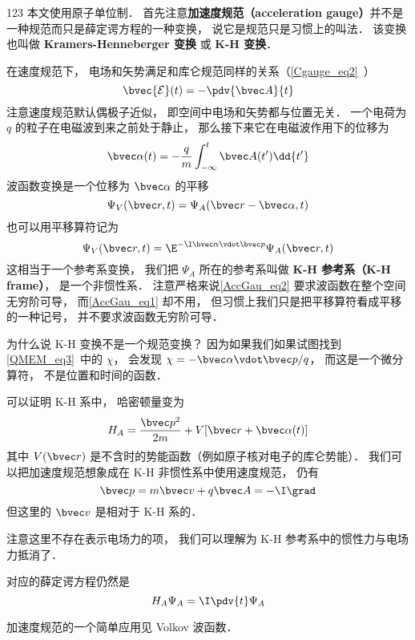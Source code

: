 

123 本文使用原子单位制． 首先注意\textbf{加速度规范（acceleration gauge）}并不是一种规范而只是薛定谔方程的一种变换， 说它是规范只是习惯上的叫法． 该变换也叫做 \textbf{Kramers-Henneberger 变换} 或 \textbf{K-H 变换}．

在速度规范下， 电场和矢势满足和库仑规范同样的关系（\autoref{Cgauge_eq2}~）
\begin{equation}
\bvec {\mathcal{E}}(t) = -\pdv{\bvec A}{t}
\end{equation}
注意速度规范默认偶极子近似， 即空间中电场和矢势都与位置无关． 一个电荷为 $q$ 的粒子在电磁波到来之前处于静止， 那么接下来它在电磁波作用下的位移为
\begin{equation}\label{AccGau_eq3}
\bvec \alpha(t) = -\frac{q}{m}\int_{-\infty}^t \bvec A(t') \dd{t'}
\end{equation}
波函数变换是一个位移为 $\bvec \alpha$ 的平移
\begin{equation}\label{AccGau_eq1}
\Psi_V(\bvec r, t) = \Psi_A(\bvec r - \bvec \alpha, t)
\end{equation}
也可以用平移算符记为
\begin{equation}\label{AccGau_eq2}
\Psi_V(\bvec r, t) = \E^{-\I \bvec \alpha \vdot \bvec p} \Psi_A(\bvec r, t)
\end{equation}
这相当于一个参考系变换， 我们把 $\Psi_A$ 所在的参考系叫做 \textbf{K-H 参考系（K-H frame）}， 是一个非惯性系． 注意严格来说\autoref{AccGau_eq2} 要求波函数在整个空间无穷阶可导， 而\autoref{AccGau_eq1} 却不用， 但习惯上我们只是把平移算符看成平移的一种记号， 并不要求波函数无穷阶可导．

为什么说 K-H 变换不是一个规范变换？ 因为如果我们如果试图找到\autoref{QMEM_eq3}~中的 $\chi$， 会发现 $\chi = -\bvec \alpha \vdot \bvec p/q$， 而这是一个微分算符， 不是位置和时间的函数．

可以证明 K-H 系中， 哈密顿量变为
\begin{equation}
H_A = \frac{\bvec p^2}{2m} + V[\bvec r + \bvec \alpha(t)]
\end{equation}
其中 $V(\bvec r)$ 是不含时的势能函数（例如原子核对电子的库仑势能）． 我们可以把加速度规范想象成在 K-H 非惯性系中使用速度规范， 仍有
\begin{equation}
\bvec p = m\bvec v + q\bvec A = -\I \grad
\end{equation}
但这里的 $\bvec v$ 是相对于 K-H 系的．

注意这里不存在表示电场力的项， 我们可以理解为 K-H 参考系中的惯性力与电场力抵消了．

对应的薛定谔方程仍然是
\begin{equation}\label{AccGau_eq4}
H_A \Psi_A = \I \pdv{t} \Psi_A
\end{equation}

加速度规范的一个简单应用见 Volkov 波函数．
